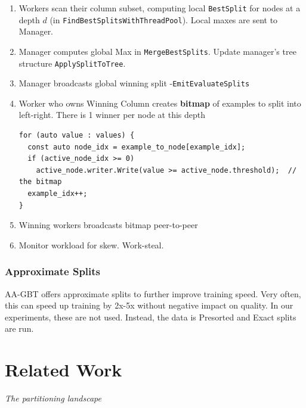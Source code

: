 \documentclass[sigconf,screen]{acmart}
\begin{document}
\begin{enumerate}
    \item Workers scan their column subset, computing local \texttt{BestSplit} for nodes at a depth $d$ (in \texttt{FindBestSplitsWithThreadPool}). Local maxes are sent to Manager.
    \item Manager computes global Max in \texttt{MergeBestSplits}. Update manager's tree structure \texttt{ApplySplitToTree}.
    \item Manager broadcasts global winning split -\newline \texttt{EmitEvaluateSplits}
    \item Worker who owns Winning Column creates \textbf{bitmap} of examples to split into left-right. There is 1 winner per node at this depth
        \begin{lstlisting}
for (auto value : values) {
  const auto node_idx = example_to_node[example_idx];
  if (active_node_idx >= 0)
    active_node.writer.Write(value >= active_node.threshold);  // the bitmap
  example_idx++;
}
        \end{lstlisting}
    \item Winning workers broadcasts bitmap peer-to-peer
    \item Monitor workload for skew. Work-steal.
\end{enumerate}


\subsubsection{Approximate Splits}

AA-GBT offers approximate splits to further improve training speed. Very often, this can speed up training by 2x-5x without negative impact on quality. In our experiments, these are not used. Instead, the data is Presorted and Exact splits are run.

\section{Related Work}

\textit{The partitioning landscape}
\end{document}
